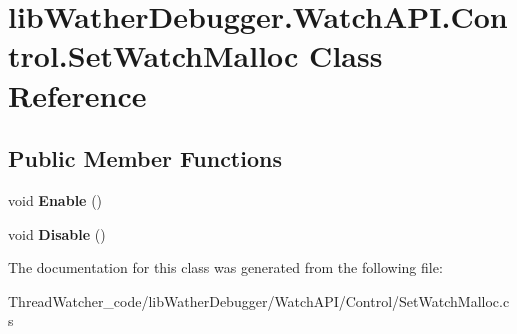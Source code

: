 \hypertarget{classlib_wather_debugger_1_1_watch_a_p_i_1_1_control_1_1_set_watch_malloc}{\section{lib\+Wather\+Debugger.\+Watch\+A\+P\+I.\+Control.\+Set\+Watch\+Malloc Class Reference}
\label{classlib_wather_debugger_1_1_watch_a_p_i_1_1_control_1_1_set_watch_malloc}
}
\subsection*{Public Member Functions}
\begin{DoxyCompactItemize}
\item 
\hypertarget{classlib_wather_debugger_1_1_watch_a_p_i_1_1_control_1_1_set_watch_malloc_aeae03d9cb2453c92f135c5a0f4c93f58}{void {\bfseries Enable} ()}\label{classlib_wather_debugger_1_1_watch_a_p_i_1_1_control_1_1_set_watch_malloc_aeae03d9cb2453c92f135c5a0f4c93f58}

\item 
\hypertarget{classlib_wather_debugger_1_1_watch_a_p_i_1_1_control_1_1_set_watch_malloc_a72631c0471fc1fc15f7a55abfa456e04}{void {\bfseries Disable} ()}\label{classlib_wather_debugger_1_1_watch_a_p_i_1_1_control_1_1_set_watch_malloc_a72631c0471fc1fc15f7a55abfa456e04}

\end{DoxyCompactItemize}


The documentation for this class was generated from the following file\+:\begin{DoxyCompactItemize}
\item 
Thread\+Watcher\+\_\+code/lib\+Wather\+Debugger/\+Watch\+A\+P\+I/\+Control/Set\+Watch\+Malloc.\+cs\end{DoxyCompactItemize}

